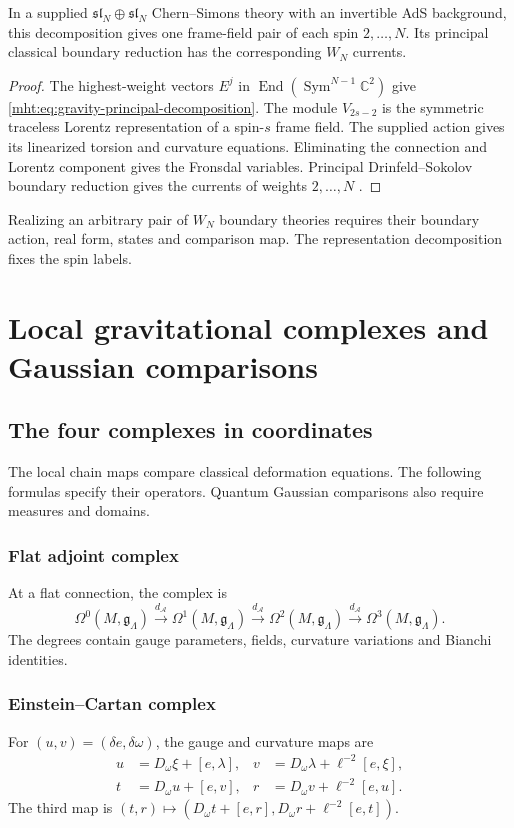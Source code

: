 \begin{theorem}
In a supplied $\mathfrak{sl}_N\oplus\mathfrak{sl}_N$
Chern--Simons theory with an invertible AdS background,
this decomposition gives one frame-field pair of each spin
$2,\ldots,N$.
Its principal classical boundary reduction has the corresponding
$W_N$ currents.
\end{theorem}
\begin{proof}
The highest-weight vectors $E^j$ in
$\operatorname{End}(\operatorname{Sym}^{N-1}\mathbb C^2)$
give \eqref{mht:eq:gravity-principal-decomposition}.
The module $V_{2s-2}$ is the symmetric traceless Lorentz
representation of a spin-$s$ frame field.
The supplied action gives its linearized torsion and curvature
equations. Eliminating the connection and Lorentz component
gives the Fronsdal variables.
Principal Drinfeld--Sokolov boundary reduction gives the
currents of weights $2,\ldots,N$
\cite{CampoleoniHigherSpin,HenneauxRey}.
\end{proof}

Realizing an arbitrary pair of $W_N$ boundary theories requires
their boundary action, real form, states and comparison map.
The representation decomposition fixes the spin labels.

\part{Local gravitational complexes and Gaussian comparisons}

\chapter{The four complexes in coordinates}
The local chain maps compare classical deformation equations.
The following formulas specify their operators.
Quantum Gaussian comparisons also require measures and domains.

\section{Flat adjoint complex}
At a flat connection, the complex is
\[
 \Omega^0(M,\mathfrak g_\Lambda)\xrightarrow{d_{\mathcal A}}
 \Omega^1(M,\mathfrak g_\Lambda)\xrightarrow{d_{\mathcal A}}
 \Omega^2(M,\mathfrak g_\Lambda)\xrightarrow{d_{\mathcal A}}
 \Omega^3(M,\mathfrak g_\Lambda).
\]
The degrees contain gauge parameters, fields, curvature
variations and Bianchi identities.

\section{Einstein--Cartan complex}
For $(u,v)=(\delta e,\delta\omega)$, the gauge and curvature maps are
\[
 \begin{aligned}
 u&=D_\omega\xi+[e,\lambda],
 &v&=D_\omega\lambda+\ell^{-2}[e,\xi],\\
 t&=D_\omega u+[e,v],
 &r&=D_\omega v+\ell^{-2}[e,u].
 \end{aligned}
\]
The third map is
$(t,r)\mapsto(D_\omega t+[e,r],D_\omega r+\ell^{-2}[e,t])$.

